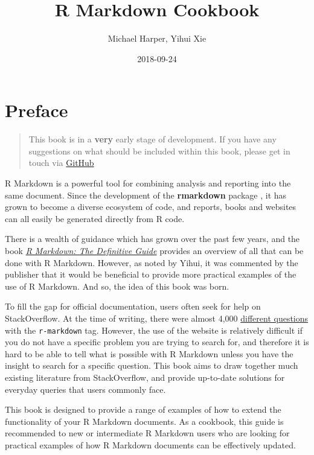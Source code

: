 \documentclass[]{book}
\title{R Markdown Cookbook}
\author{Michael Harper, Yihui Xie}
\date{2018-09-24}
\begin{document}
\maketitle

{
\setcounter{tocdepth}{1}
\tableofcontents
}
\chapter*{Preface}\label{preface}

\begin{quote}
This book is in a \textbf{very} early stage of development. If you have
any suggestions on what should be included within this book, please get
in touch via
\href{https://github.com/mikey-harper/rmarkdown-cookbook}{GitHub}
\end{quote}

R Markdown is a powerful tool for combining analysis and reporting into
the same document. Since the development of the \textbf{rmarkdown}
package \citep{R-rmarkdown}, it has grown to become a diverse ecosystem
of code, and reports, books and websites can all easily be generated
directly from R code.

There is a wealth of guidance which has grown over the past few years,
and the book \href{https://bookdown.org/yihui/rmarkdown/}{\emph{R
Markdown: The Definitive Guide}} \citep{xie2018} provides an overview of
all that can be done with R Markdown. However, as noted by Yihui, it was
commented by the publisher that it would be beneficial to provide more
practical examples of the use of R Markdown. And so, the idea of this
book was born.

To fill the gap for official documentation, users often seek for help on
StackOverflow. At the time of writing, there were almost 4,000
\href{https://stackoverflow.com/questions/tagged/r-markdown}{different
questions} with the \texttt{r-markdown} tag. However, the use of the
website is relatively difficult if you do not have a specific problem
you are trying to search for, and therefore it is hard to be able to
tell what is possible with R Markdown unless you have the insight to
search for a specific question. This book aims to draw together much
existing literature from StackOverflow, and provide up-to-date solutions
for everyday queries that users commonly face.

This book is designed to provide a range of examples of how to extend
the functionality of your R Markdown documents. As a cookbook, this
guide is recommended to new or intermediate R Markdown users who are
looking for practical examples of how R Markdown documents can be
effectively updated.
\end{document}

